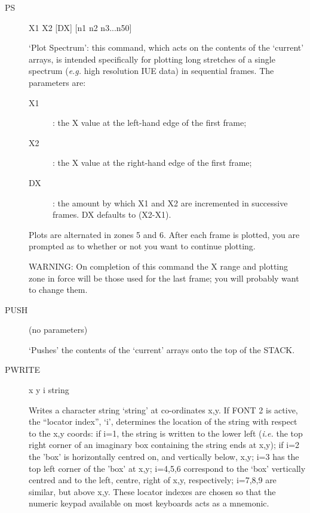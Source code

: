 \begin {description}
\item [PS] X1 X2 [DX] [n1 n2 n3...n50]

`Plot Spectrum': this command, which acts on the contents of the
`current' arrays, is intended specifically for plotting long stretches
of a single spectrum ({\em e.g.} high resolution IUE data) in
sequential frames. The parameters are:

\begin{description}
\begin{description}

\item [X1]: the X value at the left-hand edge of the first frame;

\item [X2]: the X value at the right-hand edge of the first frame;

\item [DX]: the amount by which X1 and X2 are incremented in
successive frames. DX defaults to (X2-X1).

\end{description}
\end{description}

Plots are alternated in zones 5 and 6. After each frame is plotted,
you are prompted as to whether or not you want to continue plotting.

WARNING: On completion of this command the X range and plotting zone
in force will be those used for the last frame; you will probably want
to change them.

\item [PUSH] (no parameters)

`Pushes' the contents of the `current' arrays onto the top of the STACK.

\item [PWRITE] x y i string

Writes a character string `string' at co-ordinates x,y. If FONT 2 is
active, the ``locator index'', `i', determines the location of the
string with respect to the x,y coords: if i=1, the string is written
to the lower left  ({\em i.e.} the top right corner of an imaginary
box containing the string ends at x,y);  if i=2 the 'box' is
horizontally centred on, and vertically below, x,y;  i=3 has the top
left corner of the 'box' at x,y; i=4,5,6 correspond to the `box'
vertically centred and to the left, centre, right of x,y,
respectively; i=7,8,9 are similar, but above x,y. These locator
indexes are chosen so that the numeric keypad available on most
keyboards acts as a mnemonic.


\end{description}
